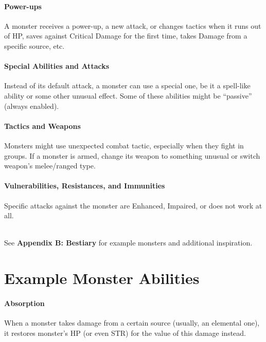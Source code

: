 \documentclass[itdr]{subfiles}
\begin{document}
\paragraph{Power-ups}
A monster receives a power-up, a new attack, or changes tactics when it runs out of HP, saves against Critical Damage for the first time, takes Damage from a specific source, etc.

\paragraph{Special Abilities and Attacks}
Instead of its default attack, a monster can use a special one, be it a spell-like ability or some other unusual effect. Some of these abilities might be ``passive'' (always enabled).

\paragraph{Tactics and Weapons}
Monsters might use unexpected combat tactic, especially when they fight in groups. If a monster is armed, change its weapon to something unusual or switch weapon's melee/ranged type.

\paragraph{Vulnerabilities, Resistances, and Immunities}
Specific attacks against the monster are Enhanced, Impaired, or does not work at all.

\vfill

\begin{dbox}
	~\\
	See \textbf{Appendix B: Bestiary} for example monsters and additional inspiration.
\end{dbox}

\vfill

\break

\section{Example Monster Abilities}

\paragraph{Absorption}
When a monster takes damage from a certain source (usually, an elemental one), it restores monster's HP (or even STR) for the value of this damage instead.
\end{document}
